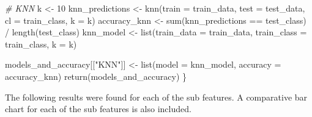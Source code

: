\documentclass[
]{article}
\newenvironment{Shaded}{\begin{snugshade}}{\end{snugshade}}
\newcommand{\AttributeTok}[1]{\textcolor[rgb]{0.77,0.63,0.00}{#1}}
\newcommand{\CommentTok}[1]{\textcolor[rgb]{0.56,0.35,0.01}{\textit{#1}}}
\newcommand{\DecValTok}[1]{\textcolor[rgb]{0.00,0.00,0.81}{#1}}
\newcommand{\FunctionTok}[1]{\textcolor[rgb]{0.00,0.00,0.00}{#1}}
\newcommand{\NormalTok}[1]{#1}
\newcommand{\OtherTok}[1]{\textcolor[rgb]{0.56,0.35,0.01}{#1}}
\newcommand{\SpecialCharTok}[1]{\textcolor[rgb]{0.00,0.00,0.00}{#1}}
\newcommand{\StringTok}[1]{\textcolor[rgb]{0.31,0.60,0.02}{#1}}
\begin{document}
\begin{Shaded}
\begin{Highlighting}[]
  \CommentTok{\# KNN}
\NormalTok{  k }\OtherTok{\textless{}{-}} \DecValTok{10}
\NormalTok{  knn\_predictions }\OtherTok{\textless{}{-}} \FunctionTok{knn}\NormalTok{(}\AttributeTok{train =}\NormalTok{ train\_data, }\AttributeTok{test =}\NormalTok{ test\_data, }\AttributeTok{cl =}\NormalTok{ train\_class, }\AttributeTok{k =}\NormalTok{ k)}
\NormalTok{  accuracy\_knn }\OtherTok{\textless{}{-}} \FunctionTok{sum}\NormalTok{(knn\_predictions }\SpecialCharTok{==}\NormalTok{ test\_class) }\SpecialCharTok{/} \FunctionTok{length}\NormalTok{(test\_class)}
\NormalTok{  knn\_model }\OtherTok{\textless{}{-}} \FunctionTok{list}\NormalTok{(}\AttributeTok{train\_data =}\NormalTok{ train\_data, }\AttributeTok{train\_class =}\NormalTok{ train\_class, }\AttributeTok{k =}\NormalTok{ k)}

\NormalTok{  models\_and\_accuracy[[}\StringTok{"KNN"}\NormalTok{]] }\OtherTok{\textless{}{-}} \FunctionTok{list}\NormalTok{(}\AttributeTok{model =}\NormalTok{ knn\_model, }\AttributeTok{accuracy =}\NormalTok{ accuracy\_knn)}
  \FunctionTok{return}\NormalTok{(models\_and\_accuracy)}
\NormalTok{\}}
\end{Highlighting}
\end{Shaded}

The following results were found for each of the sub features. A comparative bar chart for each of the sub features is also included.
\end{document}
